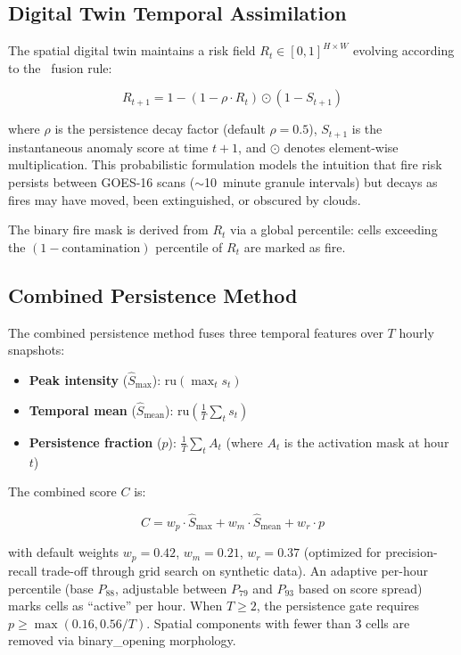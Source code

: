 \documentclass[5p,twocolumn]{elsarticle}
\newcommand{\abbrev}[1]{{\small\textsc{#1}}}
\newcommand{\prob}{\text{prob\_or}}
\newcommand{\ru}{\text{ru}}
\begin{document}
\subsection{Digital Twin Temporal Assimilation}

The spatial digital twin maintains a risk field $R_t \in [0,1]^{H \times W}$ evolving according to the \prob\ fusion rule:

\begin{equation}
R_{t+1} = 1 - (1 - \rho \cdot R_t) \odot (1 - S_{t+1})
\label{eq:probor}
\end{equation}

where $\rho$ is the persistence decay factor (default $\rho = 0.5$), $S_{t+1}$ is the instantaneous anomaly score at time $t+1$, and $\odot$ denotes element-wise multiplication. This probabilistic formulation models the intuition that fire risk persists between \abbrev{GOES-16} scans ($\sim$10~minute granule intervals) but decays as fires may have moved, been extinguished, or obscured by clouds.

The binary fire mask is derived from $R_t$ via a global percentile: cells exceeding the $(1 - \text{contamination})$ percentile of $R_t$ are marked as fire.

\subsection{Combined Persistence Method}

The combined persistence method fuses three temporal features over $T$ hourly snapshots:

\begin{itemize}
  \item \textbf{Peak intensity} ($\hat{S}_{\max}$): $\ru(\max_t s_t)$
  \item \textbf{Temporal mean} ($\hat{S}_{\text{mean}}$): $\ru(\frac{1}{T} \sum_t s_t)$
  \item \textbf{Persistence fraction} ($p$): $\frac{1}{T} \sum_t A_t$ (where $A_t$ is the activation mask at hour $t$)
\end{itemize}

The combined score $C$ is:

\begin{equation}
C = w_p \cdot \hat{S}_{\max} + w_m \cdot \hat{S}_{\text{mean}} + w_r \cdot p
\label{eq:combined}
\end{equation}

with default weights $w_p = 0.42$, $w_m = 0.21$, $w_r = 0.37$ (optimized for precision-recall trade-off through grid search on synthetic data). An adaptive per-hour percentile (base $P_{88}$, adjustable between $P_{79}$ and $P_{93}$ based on score spread) marks cells as ``active'' per hour. When $T \geq 2$, the persistence gate requires $p \geq \max(0.16, 0.56/T)$. Spatial components with fewer than 3 cells are removed via binary\_opening morphology.
\end{document}
